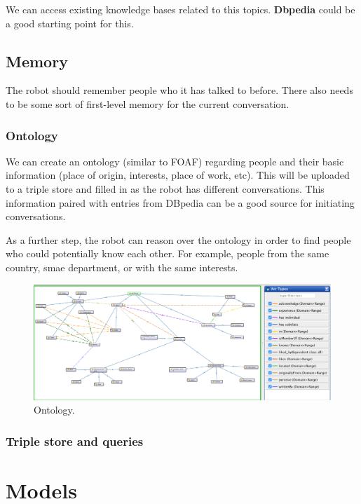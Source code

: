 \documentclass[a4paper]{article}
\begin{document}
We can access existing knowledge bases related to this topics. \textbf{Dbpedia} could be a good starting point for this. 


\subsection{Memory}
The robot should remember people who it has talked to before. There also needs to be some sort of first-level memory for the current conversation.

\subsubsection{Ontology}
We can create an ontology (similar to FOAF) regarding people and their basic information (place of origin, interests, place of work, etc). This will be uploaded to a triple store and filled in as the robot has different  conversations. This information paired with entries from DBpedia can be a good source for initiating conversations. 

As a further step, the robot can reason over the ontology in order to find people who could potentially know each other. For example, people from the same country, smae department, or with the same interests. 

\begin{figure}[h]
  \includegraphics[width=\linewidth]{images/ontology.png}
  \caption{Ontology.}
  \label{fig:ontology}
\end{figure}

\subsubsection{Triple store and queries}


\newpage
\section{Models}
\end{document}
